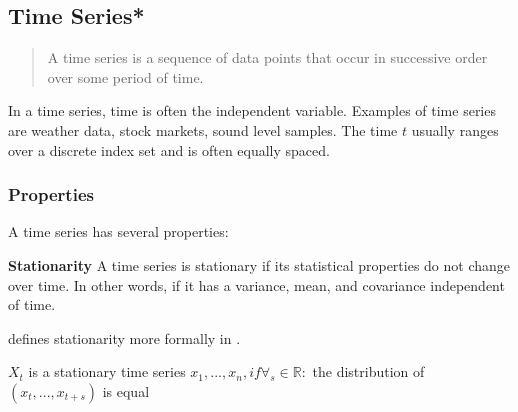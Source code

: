 \subsection{Time Series*}
\label{sec:time series}
\begin{quote}
  A time series is a sequence of data
  points that occur in successive order over some period of time.
\end{quote}
\cite{Hayes}

In a time series, time is often the independent variable.
Examples of time series are weather data, stock markets, sound level samples.
The time $t$ usually ranges over a discrete index set and is often equally spaced.

\subsubsection{Properties}
A time series has several properties:


\textbf{Stationarity}
A time series is stationary if its statistical properties do not change over time.
In other words, if it has a variance, mean, and covariance independent of time.

\cite{RobJHyndman2014} defines stationarity more formally in .
\begin{definition}
  \label{def:seasonality}
  $X_t$ is a stationary time series
  $x_1, ..., x_n, if \forall_s \in \mathbb{R} :$
  the distribution of $(x_t, ..., x_{t+s})$ is equal
\end{definition}

